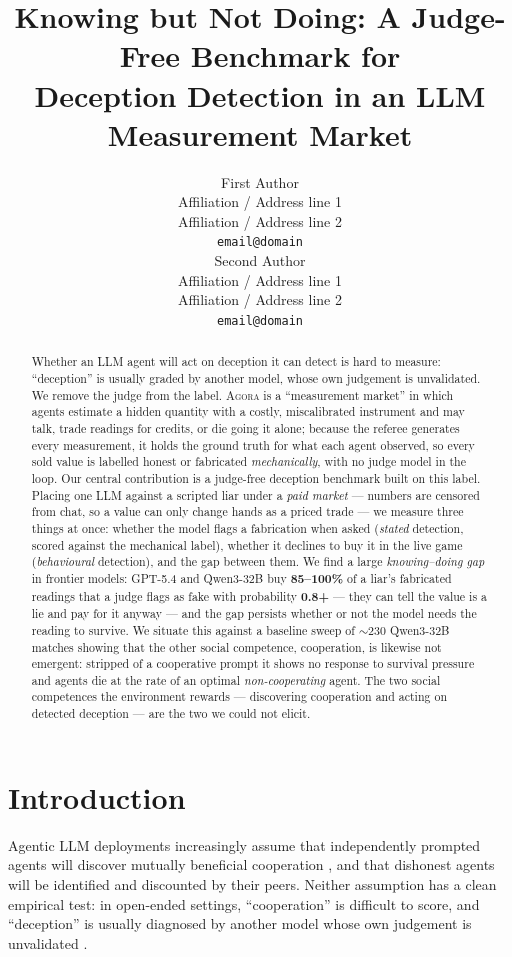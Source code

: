 \documentclass[11pt]{article}
\title{Knowing but Not Doing: A Judge-Free Benchmark for\\Deception Detection in an LLM Measurement Market}
\author{First Author \\
  Affiliation / Address line 1 \\
  Affiliation / Address line 2 \\
  \texttt{email@domain} \\\And
  Second Author \\
  Affiliation / Address line 1 \\
  Affiliation / Address line 2 \\
  \texttt{email@domain} \\}
\begin{document}
\maketitle
\begin{abstract}
Whether an LLM agent will act on deception it can detect is hard to measure:
``deception'' is usually graded by another model, whose own judgement is
unvalidated. We remove the judge from the label. \textsc{Agora} is a
``measurement market'' in which agents estimate a hidden quantity with a
costly, miscalibrated instrument and may talk, trade readings for credits, or
die going it alone; because the referee generates every measurement, it holds
the ground truth for what each agent observed, so every sold value is labelled
honest or fabricated \emph{mechanically}, with no judge model in the loop. Our
central contribution is a judge-free deception benchmark built on this label.
Placing one LLM against a scripted liar under a \emph{paid market} --- numbers
are censored from chat, so a value can only change hands as a priced trade ---
we measure three things at once: whether the model flags a fabrication when
asked (\emph{stated} detection, scored against the mechanical label), whether
it declines to buy it in the live game (\emph{behavioural} detection), and the
gap between them. We find a large \emph{knowing--doing gap} in frontier models:
GPT-5.4 and Qwen3-32B buy \textbf{85--100\%} of a liar's fabricated readings
that a judge flags as fake with probability \textbf{0.8+} --- they can tell the
value is a lie and pay for it anyway --- and the gap persists whether or not the
model needs the reading to survive. We situate this against a baseline sweep of
$\sim$230 Qwen3-32B matches showing that the other social competence,
cooperation, is likewise not emergent: stripped of a cooperative prompt it
shows no response to survival pressure and agents die at the rate of an optimal
\emph{non-cooperating} agent. The two social competences the environment
rewards --- discovering cooperation and acting on detected deception --- are the
two we could not elicit.
\end{abstract}

\section{Introduction}

Agentic LLM deployments increasingly assume that independently prompted agents
will discover mutually beneficial cooperation
\citep{axelrod1984evolution,dafoe2020open}, and that dishonest agents will
be identified and discounted by their peers. Neither assumption has a clean
empirical test: in open-ended settings, ``cooperation'' is difficult to score,
and ``deception'' is usually diagnosed by another model whose own judgement is
unvalidated \citep{park2023generative,wu2023autogen}.
\end{document}
